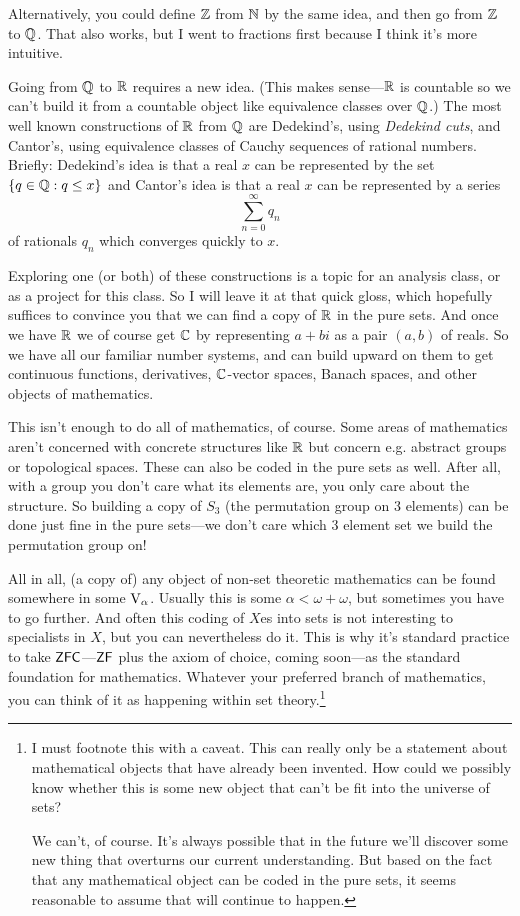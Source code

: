 \documentclass[10pt]{amsart}
\begin{document}
Alternatively, you could define $\mathbb{Z}$ from $\mathbb{N}$ by the same idea, and then go from $\mathbb{Z}$ to $\mathbb{Q}$. That also works, but I went to fractions first because I think it's more intuitive.

Going from $\mathbb{Q}$ to $\mathbb{R}$ requires a new idea. (This makes sense---$\mathbb{R}$ is countable so we can't build it from a countable object like equivalence classes over $\mathbb{Q}$.) The most well known constructions of $\mathbb{R}$ from $\mathbb{Q}$ are Dedekind's, using \emph{Dedekind cuts}, and Cantor's, using equivalence classes of Cauchy sequences of rational numbers. Briefly: Dedekind's idea is that a real $x$ can be represented by the set $\{ q \in \mathbb{Q} : q \le x \}$ and Cantor's idea is that a real $x$ can be represented by a series
\[
\sum_{n = 0}^\infty q_n
\]
of rationals $q_n$ which converges quickly to $x$. 

Exploring one (or both) of these constructions is a topic for an analysis class, or as a project for this class. So I will leave it at that quick gloss, which hopefully suffices to convince you that we can find a copy of $\mathbb{R}$ in the pure sets. And once we have $\mathbb{R}$ we of course get $\mathbb{C}$ by representing $a + bi$ as a pair $(a,b)$ of reals. So we have all our familiar number systems, and can build upward on them to get continuous functions, derivatives, $\mathbb{C}$-vector spaces, Banach spaces, and other objects of mathematics. 

This isn't enough to do all of mathematics, of course. Some areas of mathematics aren't concerned with concrete structures like $\mathbb{R}$ but concern e.g. abstract groups or topological spaces. These can also be coded in the pure sets as well. After all, with a group you don't care what its elements are, you only care about the structure. So building a copy of $S_3$ (the permutation group on $3$ elements) can be done just fine in the pure sets---we don't care which $3$ element set we build the permutation group on!

All in all, (a copy of) any object of non-set theoretic mathematics can be found somewhere in some $\mathrm{V}_\alpha$. Usually this is some $\alpha < \omega + \omega$, but sometimes you have to go further. And often this coding of $X$es into sets is not interesting to specialists in $X$, but you can nevertheless do it. This is why it's standard practice to take $\mathsf{ZFC}$---$\mathsf{ZF}$ plus the axiom of choice, coming soon---as the standard foundation for mathematics. Whatever your preferred branch of mathematics, you can think of it as happening within set theory.\footnote{I must footnote this with a caveat. This can really only be a statement about mathematical objects that have already been invented. How could we possibly know whether this is some new object that can't be fit into the universe of sets?

We can't, of course. It's always possible that in the future we'll discover some new thing that overturns our current understanding. But based on the fact that any mathematical object can be coded  in the pure sets, it seems reasonable to assume that will continue to happen.}
\smallskip
\end{document}
